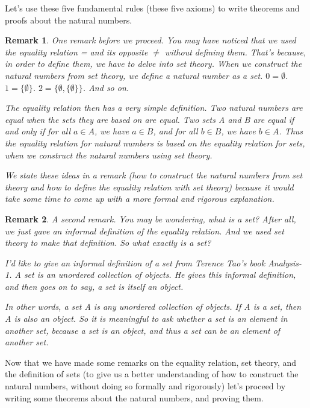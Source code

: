 \documentclass{article}
\newtheorem{remark}{Remark}
\begin{document}
Let's use these five fundamental rules (these five axioms) to write theorems and proofs about the natural numbers. 

\begin{remark}
One remark before we proceed. You may have noticed that we used the equality relation = and its opposite $\neq$ without defining them. That's because, in order to define them, we have to delve into set theory. When we construct the natural numbers from set theory, we define a natural number as a set. $0 = \emptyset$. $1 = \{\emptyset\}$. $2 = \{\emptyset, \{\emptyset\}\}$. And so on.

The equality relation then has a very simple definition. Two natural numbers are equal when the sets they are based on are equal. Two sets A and B are equal if and only if for all $a \in A$, we have $a \in B$, and for all $b \in B$, we have $b \in A$. Thus the equality relation for natural numbers is based on the equality relation for sets, when we construct the natural numbers using set theory.

We state these ideas in a remark (how to construct the natural numbers from set theory and how to define the equality relation with set theory) because it would take some time to come up with a more formal and rigorous explanation.
\end{remark}

\begin{remark}
A second remark. You may be wondering, what is a set? After all, we just gave an informal definition of the equality relation. And we used set theory to make that definition. So what exactly is a set?

I'd like to give an informal definition of a set from Terence Tao's book Analysis-1. A set is an unordered collection of objects. He gives this informal definition, and then goes on to say, a set is itself an object. 

In other words, a set A is any unordered collection of objects. If A is a set, then A is also an object. So it is meaningful to ask whether a set is an element in another set, because a set is an object, and thus a set can be an element of another set.
\end{remark}

Now that we have made some remarks on the equality relation, set theory, and the definition of sets (to give us a better understanding of how to construct the natural numbers, without doing so formally and rigorously) let's proceed by writing some theorems about the natural numbers, and proving them. \\
\end{document}
